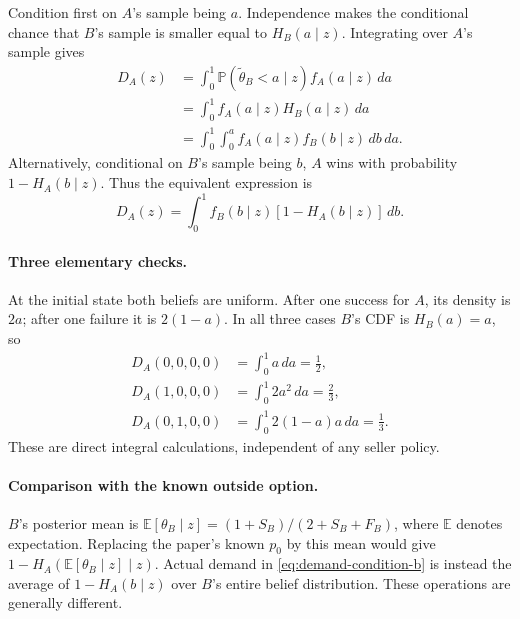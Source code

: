 \documentclass[11pt]{article}
\newcommand{\E}{\mathbb E}
\newcommand{\Pb}{\mathbb P}
\begin{document}
Condition first on $A$'s sample being $a$. Independence makes the
conditional chance that $B$'s sample is smaller equal to $H_B(a\mid z)$.
Integrating over $A$'s sample gives
\begin{equation}\label{eq:demand-integral}
\begin{aligned}
D_A(z)
&=\int_0^1\Pb(\widetilde\theta_B<a\mid z)f_A(a\mid z)\,da\\
&=\int_0^1 f_A(a\mid z)H_B(a\mid z)\,da\\
&=\int_0^1\int_0^a f_A(a\mid z)f_B(b\mid z)\,db\,da.
\end{aligned}
\end{equation}
Alternatively, conditional on $B$'s sample being $b$, $A$ wins with
probability $1-H_A(b\mid z)$. Thus the equivalent expression is
\begin{equation}\label{eq:demand-condition-b}
D_A(z)=\int_0^1 f_B(b\mid z)[1-H_A(b\mid z)]\,db.
\end{equation}

\paragraph{Three elementary checks.}
At the initial state both beliefs are uniform. After one success for $A$,
its density is $2a$; after one failure it is $2(1-a)$. In all three cases
$B$'s CDF is $H_B(a)=a$, so
\begin{equation}\label{eq:demand-checks}
\begin{aligned}
D_A(0,0,0,0)&=\int_0^1 a\,da=\frac12,\\
D_A(1,0,0,0)&=\int_0^1 2a^2\,da=\frac23,\\
D_A(0,1,0,0)&=\int_0^1 2(1-a)a\,da=\frac13.
\end{aligned}
\end{equation}
These are direct integral calculations, independent of any seller policy.

\paragraph{Comparison with the known outside option.}
$B$'s posterior mean is
$\E[\theta_B\mid z]=(1+S_B)/(2+S_B+F_B)$, where $\E$ denotes
expectation. Replacing the paper's known $p_0$ by this mean would give
$1-H_A(\E[\theta_B\mid z]\mid z)$. Actual demand in
\eqref{eq:demand-condition-b} is instead the average of
$1-H_A(b\mid z)$ over $B$'s entire belief distribution. These operations
are generally different.
\end{document}
